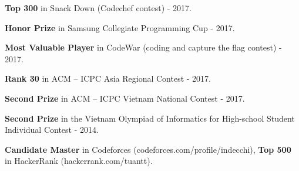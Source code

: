 
\begin{cvempty}

\begin{cvitems} %
  \item {\textbf{Top 300} in Snack Down (Codechef contest) - 2017.}
  \item {\textbf{Honor Prize} in Samsung Collegiate Programming Cup - 2017.}
  \item {\textbf{Most Valuable Player} in CodeWar (coding and capture the flag contest) - 2017.}
  \item {\textbf{Rank 30} in ACM – ICPC Asia Regional Contest - 2017.}
  \item {\textbf{Second Prize} in ACM – ICPC Vietnam National Contest - 2017.}
  \item {\textbf{Second Prize} in the Vietnam Olympiad of Informatics for High-school Student Individual Contest - 2014.}
  \item {\textbf{Candidate Master} in Codeforces (codeforces.com/profile/indecchi), \textbf{Top 500} in HackerRank (hackerrank.com/tuantt).}
\end{cvitems}

\end{cvempty}
